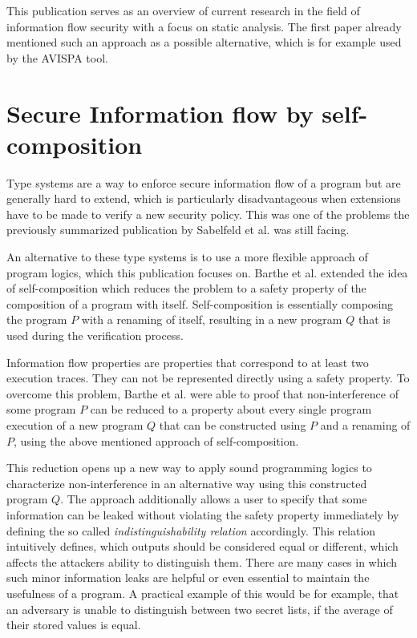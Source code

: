\documentclass[a4paper,UKenglish]{lipics-v2018}
\begin{document}
This publication serves as an overview of current research in the field of information flow security with a focus on static analysis. The first paper already mentioned such an approach as a possible alternative, which is for example used by the AVISPA tool.\cite{model_checking_security_protocols}



\section{Secure Information flow by self-composition}

Type systems are a way to enforce secure information flow of a program but are generally hard to extend, which is particularly disadvantageous when extensions have to be made to verify a new security policy. This was one of the problems the previously summarized publication by Sabelfeld et al. was still facing.
\cite{language_based_information_flow_security} 

An alternative to these type systems is to use a more flexible approach of program logics, which this publication focuses on. Barthe et al. extended the idea of self-composition which reduces the problem to a safety property of the composition of a program with itself. Self-composition is essentially composing the program $P$ with a renaming of itself, resulting in a new program $Q$ that is used during the verification process.
\cite{information_flow_by_self_composition}

Information flow properties are properties that correspond to at least two execution traces. They can not be represented directly using a safety property. To overcome this problem, Barthe et al. were able to proof that non-interference of some program $P$ can be reduced to a property about every single program execution of a new program $Q$ that can be constructed using $P$ and a renaming of $P$, using the above mentioned approach of self-composition.
\cite{information_flow_by_self_composition}

This reduction opens up a new way to apply sound programming logics to characterize non-interference in an alternative way using this constructed program $Q$. The approach additionally allows a user to specify that some information can be leaked without violating the safety property immediately by defining the so called \textit{indistinguishability relation} accordingly. This relation intuitively defines, which outputs should be considered equal or different, which affects the attackers ability to distinguish them. There are many cases in which such minor information leaks are helpful or even essential to maintain the usefulness of a program. A practical example of this would be for example, that an adversary is unable to distinguish between two secret lists, if the average of their stored values is equal.
\cite{information_flow_by_self_composition}
\end{document}
